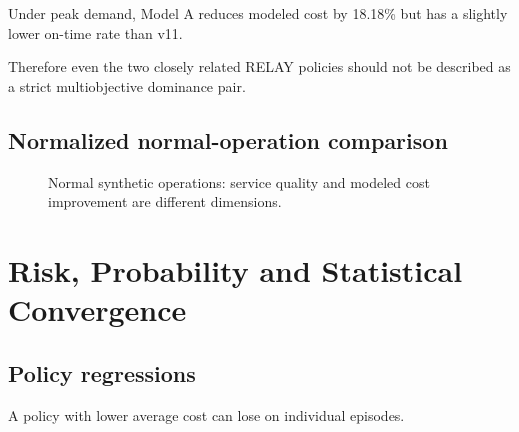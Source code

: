\documentclass[10pt,a4paper]{article}
\theoremstyle{plain}
\theoremstyle{definition}
\theoremstyle{remark}
\begin{document}
Under peak demand,
Model A reduces modeled cost by 18.18\%
but has a slightly lower on-time rate
than v11.

Therefore even the two closely related
RELAY policies should not be described
as a strict multiobjective dominance pair.

\subsection{Normalized normal-operation comparison}

\begin{figure}[!htbp]
\centering


\caption{
Normal synthetic operations:
service quality and modeled cost improvement
are different dimensions.
}
\label{fig:quality-cost-bars}
\end{figure}

\section{Risk, Probability and Statistical Convergence}

\subsection{Policy regressions}

A policy with lower average cost
can lose on individual episodes.
\end{document}

